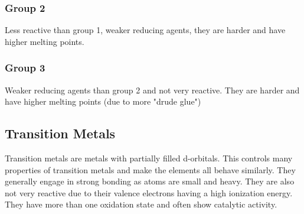 \documentclass[a4paper, 12pt]{article}
\begin{document}
			\subsubsection*{Group 2}
				Less reactive than group 1, weaker reducing agents, they are harder and have higher melting points. 
			\subsubsection*{Group 3}
				Weaker reducing agents than group 2 and not very reactive. They are harder and have higher melting points (due to more "drude glue")
			
			\subsection*{Transition Metals}
				Transition metals are metals with partially filled d-orbitals. This controls many properties of transition metals and make the elements all behave similarly. They generally engage in strong bonding as atoms are small and heavy. They are also not very reactive due to their valence electrons having a high ionization energy. They have more than one oxidation state and often show catalytic activity.
				
	\newpage				
\end{document}
